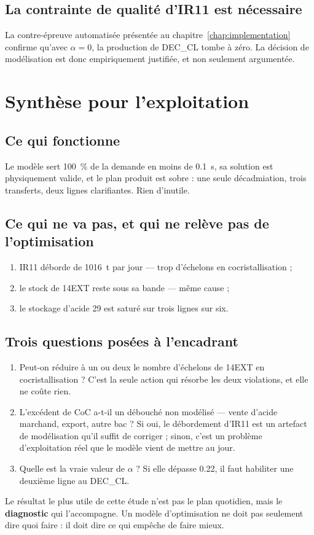 \subsection{La contrainte de qualité d'IR11 est nécessaire}

La contre-épreuve automatisée présentée au chapitre~\ref{chap:implementation} confirme
qu'avec $\alpha = 0$, la production de DEC\_CL tombe à zéro. La décision de modélisation est
donc empiriquement justifiée, et non seulement argumentée.

\section{Synthèse pour l'exploitation}

\subsection{Ce qui fonctionne}

Le modèle sert \SI{100}{\percent} de la demande en moins de \SI{0.1}{\second}, sa solution est
physiquement valide, et le plan produit est sobre : une seule décadmiation, trois transferts,
deux lignes clarifiantes. Rien d'inutile.

\subsection{Ce qui ne va pas, et qui ne relève pas de l'optimisation}

\begin{enumerate}
  \item IR11 déborde de \SI{1016}{\tonne} par jour --- trop d'échelons en cocristallisation ;
  \item le stock de 14EXT reste sous sa bande --- même cause ;
  \item le stockage d'acide 29 est saturé sur trois lignes sur six.
\end{enumerate}

\subsection{Trois questions posées à l'encadrant}

\begin{enumerate}
  \item Peut-on réduire à un ou deux le nombre d'échelons de 14EXT en cocristallisation ?
        C'est la seule action qui résorbe les deux violations, et elle ne coûte rien.
  \item L'excédent de CoC a-t-il un débouché non modélisé --- vente d'acide marchand, export,
        autre bac ? Si oui, le débordement d'IR11 est un artefact de modélisation qu'il
        suffit de corriger ; sinon, c'est un problème d'exploitation réel que le modèle vient
        de mettre au jour.
  \item Quelle est la vraie valeur de $\alpha$ ? Si elle dépasse \num{0,22}, il faut habiliter
        une deuxième ligne au DEC\_CL.
\end{enumerate}

\begin{encadre}[title={Le livrable véritable}]
Le résultat le plus utile de cette étude n'est pas le plan quotidien, mais le
\textbf{diagnostic} qui l'accompagne. Un modèle d'optimisation ne doit pas seulement dire
quoi faire : il doit dire ce qui empêche de faire mieux.
\end{encadre}
